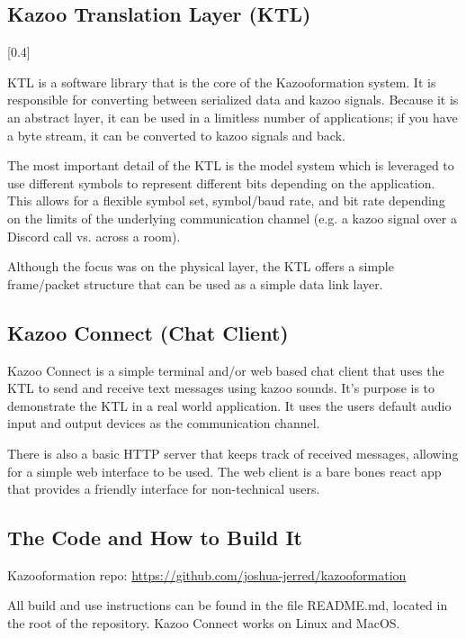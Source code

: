 \documentclass[]{article}
\begin{document}
\subsection{Kazoo Translation Layer (KTL)}

[0.4\textwidth]

KTL is a software library that is the core of the Kazooformation system. It is responsible for converting between serialized data and kazoo signals. Because
it is an abstract layer, it can be used in a limitless number of applications; if you have a byte stream, it can be converted to kazoo signals and back.

The most important detail of the KTL is the model system which is leveraged to use different symbols to represent different bits depending on the application. This allows for a flexible symbol set, symbol/baud rate, and bit rate depending on the limits of the underlying communication channel (e.g. a kazoo signal over a Discord call vs. across a room).

Although the focus was on the physical layer, the KTL offers a simple frame/packet structure that can be used as a simple data link layer.

\subsection{Kazoo Connect (Chat Client)}

Kazoo Connect is a simple terminal and/or web based chat client that uses the KTL to send and receive text messages using kazoo sounds. It's purpose is to demonstrate the KTL in a real world application. It uses the users default audio input and output devices as the communication channel.

There is also a basic HTTP server that keeps track of received messages, allowing for a simple web interface to be used. The web client is a bare bones react app that provides a friendly interface for non-technical users.

\subsection{The Code and How to Build It}
Kazooformation repo: \url{https://github.com/joshua-jerred/kazooformation}

All build and use instructions can be found in the file README.md, located in the root of the repository. Kazoo Connect works on Linux and MacOS.
\end{document}
